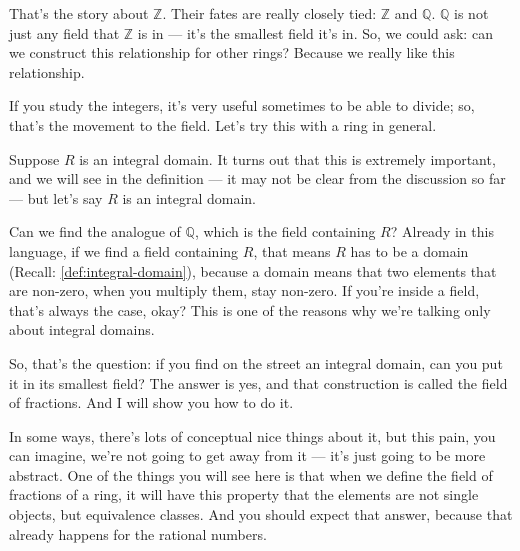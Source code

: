 \begin{speech}[00:32:50 - 00:35:03]
That's the story about $\mathbb{Z}$. Their fates are really closely tied: $\mathbb{Z}$ and $\mathbb{Q}$.  $\mathbb{Q}$ is not just any field that $\mathbb{Z}$ is in --- it's the smallest field it's in. So, we could ask: can we construct this relationship for other rings? Because we really like this relationship.

If you study the integers, it's very useful sometimes to be able to divide; so, that's the movement to the field. Let's try this with a ring in general.

Suppose $R$ is an integral domain.  It turns out that this is extremely important, and we will see in the definition --- it may not be clear from the discussion so far --- but let's say $R$ is an integral domain.

Can we find the analogue of $\mathbb{Q}$, which is the  field containing $R$?  Already in this language, if we find a field containing $R$,  that means $R$ has to be a domain (Recall: \cref{def:integral-domain}), because a domain means that two elements that are non-zero, when you multiply them, stay non-zero. If you're inside a field, that's always the case, okay? This is one of the reasons why we're talking only about integral domains.

So, that's the question: if you find on the street an integral domain, can you put it in its smallest field? The answer is yes, and that construction is called the field of fractions. And I will show you how to do it.

In some ways, there's lots of conceptual nice things about it, but this pain, you can imagine, we're not going to get away from it --- it's just going to be more abstract. One of the things you will see here is that when we define the field of fractions of a ring, it will have this property that the elements are not single objects, but equivalence classes. And you should expect that answer, because that already happens for the rational numbers.
\end{speech}

